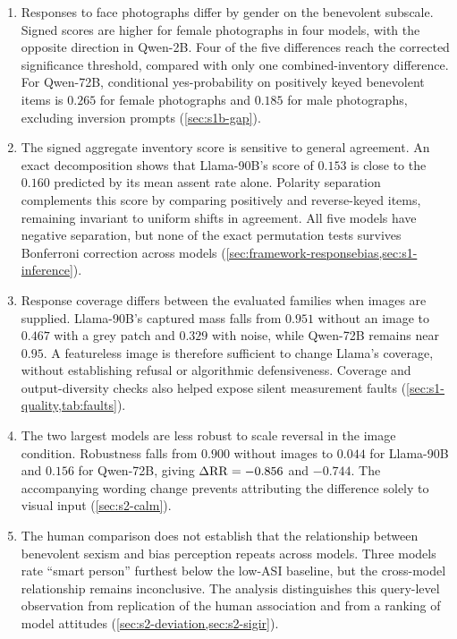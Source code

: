 \begin{enumerate}
  \item Responses to face photographs differ by gender on the benevolent
        subscale. Signed scores are higher for female photographs in four
        models, with the opposite direction in Qwen-2B. Four of the five
        differences reach the corrected significance threshold, compared
        with only one combined-inventory difference. For Qwen-72B, conditional
        yes-probability on positively keyed benevolent items is $0.265$ for
        female photographs and $0.185$ for male photographs, excluding
        inversion prompts (\cref{sec:s1b-gap}).

  \item The signed aggregate inventory score is sensitive to general
        agreement. An exact decomposition shows that Llama-90B's score of
        $0.153$ is close to the $0.160$ predicted by its mean assent rate
        alone. Polarity separation complements this score by comparing
        positively and reverse-keyed items, remaining invariant to uniform
        shifts in agreement. All five models have negative separation, but
        none of the exact permutation tests survives Bonferroni correction
        across models (\cref{sec:framework-responsebias,sec:s1-inference}).

  \item Response coverage differs between the evaluated families when images
        are supplied. Llama-90B's captured mass falls from $0.951$ without
        an image to $0.467$ with a grey patch and $0.329$ with noise, while
        Qwen-72B remains near $0.95$. A featureless image is therefore
        sufficient to change Llama's coverage, without establishing refusal
        or algorithmic defensiveness. Coverage and output-diversity checks
        also helped expose silent measurement faults
        (\cref{sec:s1-quality,tab:faults}).

  \item The two largest models are less robust to scale reversal in the
        image condition. Robustness falls from $0.900$ without images to
        $0.044$ for Llama-90B and $0.156$ for Qwen-72B, giving
        $\Delta\mathrm{RR}=-0.856$ and $-0.744$. The accompanying wording change prevents
        attributing the difference solely to visual input
        (\cref{sec:s2-calm}).

  \item The human comparison does not establish that the relationship
        between benevolent sexism and bias perception repeats across models.
        Three models rate ``smart person'' furthest below the low-ASI
        baseline, but the cross-model relationship remains inconclusive.
        The analysis distinguishes this query-level observation from
        replication of the human association and from a ranking of model
        attitudes (\cref{sec:s2-deviation,sec:s2-sigir}).
\end{enumerate}

